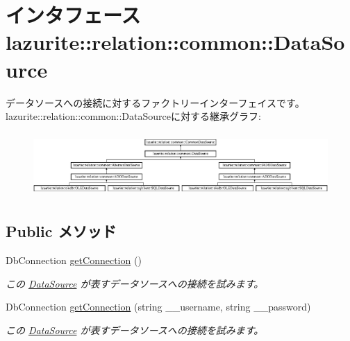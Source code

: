 \hypertarget{interfacelazurite_1_1relation_1_1common_1_1_data_source}{
\section{インタフェース lazurite::relation::common::DataSource}
\label{interfacelazurite_1_1relation_1_1common_1_1_data_source}
}


データソースへの接続に対するファクトリーインターフェイスです。  
lazurite::relation::common::DataSourceに対する継承グラフ:\begin{figure}[H]
\begin{center}
\leavevmode
\includegraphics[height=2.48227cm]{interfacelazurite_1_1relation_1_1common_1_1_data_source}
\end{center}
\end{figure}
\subsection*{Public メソッド}
\begin{DoxyCompactItemize}
\item 
DbConnection \hyperlink{interfacelazurite_1_1relation_1_1common_1_1_data_source_a463c3bbeedcd8a6332ec0a87eb530a3c}{getConnection} ()
\begin{DoxyCompactList}\small\item\em この \hyperlink{interfacelazurite_1_1relation_1_1common_1_1_data_source}{DataSource} が表すデータソースへの接続を試みます。 \item\end{DoxyCompactList}\item 
DbConnection \hyperlink{interfacelazurite_1_1relation_1_1common_1_1_data_source_a692379eb1733a5c36a25b141e6091a01}{getConnection} (string \_\-\_\-username, string \_\-\_\-password)
\begin{DoxyCompactList}\small\item\em この \hyperlink{interfacelazurite_1_1relation_1_1common_1_1_data_source}{DataSource} が表すデータソースへの接続を試みます。 \item\end{DoxyCompactList}\end{DoxyCompactItemize}


